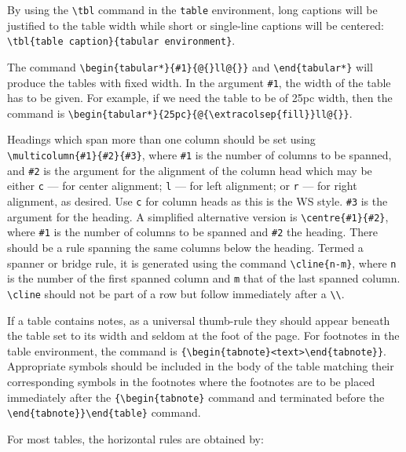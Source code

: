 By using the \verb|\tbl| command in the \verb|table| environment, long captions will
be justified to the table width while short or single-line captions
will be centered: \verb|\tbl{table caption}{tabular environment}|.

The command \verb|\begin{tabular*}{#1}{@{}ll@{}}| and \verb|\end{tabular*}|
will produce the tables with fixed width.
In the argument \verb|#1|, the width of the table has to be given.
For example, if we need the table to be of 25pc width, then the command is
\verb|\begin{tabular*}{25pc}{@{\extracolsep{fill}}ll@{}}|.

Headings which span more than one column should be set using
\verb|\multicolumn{#1}{#2}{#3}|, where \verb|#1| is the number of
columns to be spanned, and \verb|#2| is the argument for the alignment
of the column head which may be either \verb|c| --- for center
alignment; \verb|l| --- for left alignment; or \verb|r| --- for right
alignment, as desired. Use \verb|c| for column heads as
this is the WS style. \verb|#3| is the argument for the heading. A simplified
alternative version is \verb|\centre{#1}{#2}|, where \verb|#1| is
the number of columns to be spanned and \verb|#2| the heading.
There should be a rule spanning the same columns below the
heading. Termed a spanner or bridge rule, it is generated using
the command \verb|\cline{n-m}|, where \verb|n| is the number of the
first spanned column and \verb|m| that of the last spanned column.
\verb|\cline| should not be part of a row but follow immediately
after a \verb|\\|.

If a table contains notes, as a
universal thumb-rule they should appear beneath the table set to its
width and seldom at the foot of the page. For footnotes in the
table environment, the command is
\verb|{\begin{tabnote}<text>\end{tabnote}}|. Appropriate symbols
should be included in the body of the table matching their
corresponding symbols in the footnotes where the footnotes are to be
placed immediately after the \verb|{\begin{tabnote}| command and
terminated before the \verb|\end{tabnote}}\end{table}| command.

For most tables, the horizontal rules are obtained by:

